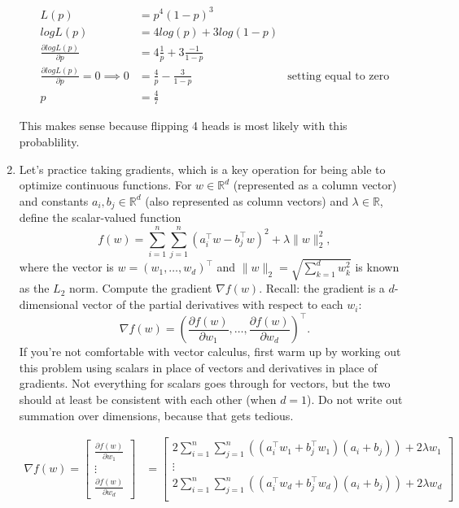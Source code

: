 \documentclass[10pt]{article}
\begin{document}
\begin{enumerate}[label=(\alph*)]
  \begin{align*}
  L(p) &= p^4(1 - p)^3\\
  logL(p) &= 4log(p) + 3log(1 - p)\\
  \frac{\partial logL(p)}{\partial p} &= 4\frac{1}{p} + 3\frac{-1}{1 - p}\\
  \frac{\partial logL(p)}{\partial p} = 0 \implies 0 &= \frac{4}{p} - \frac{3}{1 - p} &\text{setting equal to zero}\\
  p &= \frac{4}{7}
  \end{align*}
  
  This makes sense because flipping 4 heads is most likely with this probablility.
  
  \item Let's practice taking gradients, which is a key operation for being able to optimize continuous functions. For $w\in \mathbb{R}^d$ (represented as a column vector) and constants $a_i,b_j \in \mathbb{R}^d$ (also represented as column vectors) and $\lambda \in \mathbb{R}$, define the scalar-valued function
$$f(w) = \sum_{i=1}^n \sum_{j=1}^n (a_i^\top w - b_j^\top w)^2 + \lambda \lVert w \rVert_2^2,$$
where the vector is $w=(w_1,\dots,w_d)^\top$ and $\lVert w \rVert_2 = \sqrt{\sum_{k=1}^d w_k^2}$ is known as the $L_2$ norm. Compute the gradient $\nabla f(w)$.
Recall: the gradient is a $d$-dimensional vector of the partial derivatives with respect to each $w_i$:
$$\nabla f(w) = (\frac{\partial f(w)}{\partial w_1}, \dots, \frac{\partial f(w)}{\partial w_d})^\top.$$
If you're not comfortable with vector calculus, first warm up by working out this problem using scalars in place of vectors and derivatives in place of gradients. Not everything for scalars goes through for vectors, but the two should at least be consistent with each other (when $d=1$). Do not write out summation over dimensions, because that gets tedious.

  \begin{align*}
  \nabla f(w) = \begin{bmatrix}
  \frac{\partial f(w)}{\partial w_1}\\
  \vdots\\
  \frac{\partial f(w)}{\partial w_d}  
  \end{bmatrix}
  &= \begin{bmatrix}
  2\sum_{i = 1}^n \sum_{j = 1}^n ((a_i^\top w_1 + b_j^\top w_1)(a_i + b_j)) + 2\lambda w_1\\
  \vdots\\
  2\sum_{i = 1}^n \sum_{j = 1}^n ((a_i^\top w_d + b_j^\top w_d)(a_i + b_j)) + 2\lambda w_d\\
  \end{bmatrix}
  \end{align*}

\end{enumerate}
\end{document}
